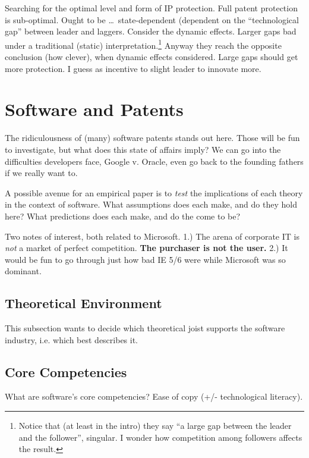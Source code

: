 \documentclass[11pt]{article}
\begin{document}
Searching for the optimal level and form of IP protection.  Full patent protection is sub-optimal.  Ought to be \ldots\ state-dependent (dependent on the ``technological gap'' between leader and laggers.  Consider the dynamic effects.  Larger gaps bad under a traditional (static) interpretation.\footnote{Notice that (at least in the intro) they say ``a large gap between the leader and the follower'', singular.  I wonder how competition among followers affects the result.}  Anyway they reach the opposite conclusion (how clever), when dynamic effects considered.  Large gaps should get more protection.  I guess as incentive to slight leader to innovate more.



\section{Software and Patents}
\label{sec:software_and_patents}

The ridiculousness of (many) software patents stands out here.  Those will be fun to investigate, but what does this state of affairs imply?  We can go into the difficulties developers face, Google v. Oracle, even go back to the founding fathers if we really want to.

A possible avenue for an empirical paper is to \emph{test} the implications of each theory in the context of software.  What assumptions does each make, and do they hold here?  What predictions does each make, and do the come to be?

Two notes of interest, both related to Microsoft. 1.) The arena of corporate IT is \emph{not} a market of perfect competition.  \textbf{The purchaser is not the user.} 2.) It would be fun to go through just how bad IE 5/6 were while Microsoft was so dominant.


\subsection{Theoretical Environment}
\label{sub:theoretical_environment}
  This subsection wants to decide which theoretical joist supports the software industry, i.e.  which best describes it.




\subsection{Core Competencies}
\label{sub:core_competencies}
  What are software's core competencies?  Ease of copy (+/- technological literacy).
\end{document}
